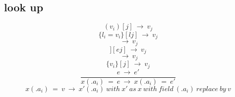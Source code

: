 \documentclass[10pt,a4paper]{article}
\begin{document}
\subsection*{ look up }
\begin{equation}(v_i)[j]     \ \rightarrow \ v_j\ \tag{\ E-LUPTUPLE\ }\end{equation} 
\begin{equation}\{l_i=v_i\}[lj] \ \rightarrow \ v_j\ \tag{\ E-LUPRECORD\ }\end{equation}
\begin{equation}[e_i=v_i][ej] \ \rightarrow \ v_j\ \tag{\ E-LUPMAP\ }\end{equation}
\begin{equation}[[e_i=v_i]][ej] \ \rightarrow \ v_j\ \tag{\ E-LUPBIGMAP\ }\end{equation}
\begin{equation}[v_i][j]     \ \rightarrow \ v_j\ \tag{\ E-LUPLIST\ }\end{equation}
\begin{equation}\{v_i\}[j]     \ \rightarrow \ v_j\ \tag{\ E-LUPSET\ }\end{equation}
\begin{equation}\frac{e\ \rightarrow \ e'}{x(.a_i)\ =\ e\ \rightarrow \ x(.a_i)\ =\ e'}\ \tag{\ E-ASSIGN\ }\end{equation}
\begin{equation}x(.a_i)\ =\ v\ \rightarrow \ x'(.a_i)\ with\ x'\ as\ x\ with\ field\ (.a_i)\ replace\ by\ v\ \tag{\ E-ASSIGN2\ }\end{equation}
\end{document}
